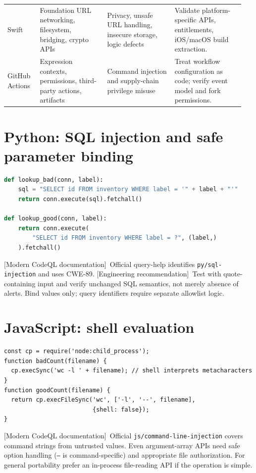 \documentclass[11pt,letterpaper,oneside]{book}
\newcommand{\srcM}{\textsf{[Modern CodeQL documentation]}}
\newcommand{\srcR}{\textsf{[Engineering recommendation]}}
\begin{document}
\begin{longtable}{>{\raggedright\arraybackslash}p{0.13\linewidth}>{\raggedright\arraybackslash}p{0.27\linewidth}>{\raggedright\arraybackslash}p{0.27\linewidth}>{\raggedright\arraybackslash}p{0.28\linewidth}}
Swift & Foundation URL networking, filesystem, bridging, crypto APIs & Privacy, unsafe URL handling, insecure storage, logic defects & Validate platform-specific APIs, entitlements, iOS/macOS build extraction.\\
GitHub Actions & Expression contexts, permissions, third-party actions, artifacts & Command injection and supply-chain privilege misuse & Treat workflow configuration as code; verify event model and fork permissions.\\
\bottomrule
\end{longtable}
\normalsize

\section{Python: SQL injection and safe parameter binding}

\begin{lstlisting}[caption={Python sqlite3: unsafe concatenation versus parameter binding},language=Python]
def lookup_bad(conn, label):
    sql = "SELECT id FROM inventory WHERE label = '" + label + "'"
    return conn.execute(sql).fetchall()

def lookup_good(conn, label):
    return conn.execute(
        "SELECT id FROM inventory WHERE label = ?", (label,)
    ).fetchall()
\end{lstlisting}

\srcM\ Official query-help identifies \texttt{py/sql-injection} and uses CWE-89. \srcR\ Test with quote-containing input and verify unchanged SQL semantics, not merely absence of alerts. Bind values only; query identifiers require separate allowlist logic.

\section{JavaScript: shell evaluation}

\begin{lstlisting}[caption={Node.js: shell string versus separated arguments}]
const cp = require('node:child_process');
function badCount(filename) {
  cp.execSync('wc -l ' + filename); // shell interprets metacharacters
}
function goodCount(filename) {
  return cp.execFileSync('wc', ['-l', '--', filename],
                         {shell: false});
}
\end{lstlisting}

\srcM\ Official \texttt{js/command-line-injection} covers command strings from untrusted values. Even argument-array APIs need safe option handling (\texttt{--} is command-specific) and appropriate file authorization. For general portability prefer an in-process file-reading API if the operation is simple.
\end{document}
